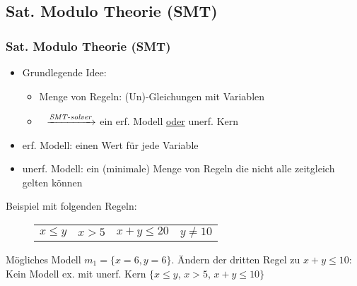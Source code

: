 \subsection{Sat. Modulo Theorie (SMT)}

\begin{frame}
	\frametitle{Sat. Modulo Theorie (SMT)}
	
	\begin{itemize}
		\item Grundlegende Idee: 
			\begin{itemize}
				\item[] Menge von Regeln: (Un)-Gleichungen mit Variablen
				\item[] \qquad$\>\>$ $\xrightarrow{\text{\textit{SMT}-\textit{solver}}}$ ein erf. Modell \underline{oder} unerf. Kern
			\end{itemize}		
		\item \color{blue}erf. Modell\color{black}: einen Wert f\"ur jede Variable
		\item \color{blue}unerf. Modell\color{black}: ein (minimale) Menge von Regeln die nicht alle zeitgleich gelten k\"onnen
	\end{itemize}
	\begin{example}
		Beispiel mit folgenden Regeln:
		\vspace*{-1em}
		\begin{figure}[H]
			\centering
			\begin{tabular}{cccc}
				$x \le y$ &	$x > 5 $ &	$ x+ y \le 20$ &$y \neq 10$ \\
			\end{tabular}
		\end{figure}
		\vspace*{-1em}
		 M\"ogliches Modell $m_1 = \{x=6, y=6\}$.\newline \newline
		 \"Andern der dritten Regel zu $x+y\le10$:\newline
		 Kein Modell ex. mit unerf. Kern $\{x \le y$, $x > 5$, $x+ y \le 10 \}$
	\end{example}
\end{frame}
